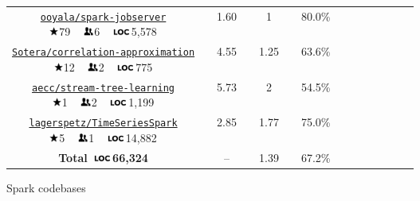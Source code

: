 \documentclass[runningheads]{llncs}
\newcommand{\myrowcolour}{\rowcolor[gray]{0.925}}
\newcommand*\loc{\includegraphics[height=0.65em,keepaspectratio]{loc}}
\newcommand*\stars{\includegraphics[height=0.8em,keepaspectratio]{stars}}
\newcommand*\contribs{\includegraphics[height=0.8em,keepaspectratio]{contribs}}
\begin{document}
\begin{sloppypar}
\begin{figure}
\begin{longtable}{c@{}c c@{}c c@{}c c@{}c c@{}c c@{}c c@{}c }
\myrowcolour%
\parbox[c][0.9cm]{4cm}{\centering\normalsize\href{https://github.com/ooyala/spark-jobserver}{\texttt{ooyala/spark-jobserver}}\\ \stars 79 ~ \contribs 6 ~ \loc 5,578} && 1.60 && 1 && 80.0\% \\

\parbox[c][0.9cm]{5cm}{\centering\normalsize\href{https://github.com/Sotera/correlation-approximation}{\texttt{Sotera/correlation-approximation}}\\ \stars 12 ~ \contribs 2 ~ \loc 775} && 4.55 && 1.25 && 63.6\% \\

\myrowcolour%
\parbox[c][0.9cm]{4cm}{\centering\normalsize\href{https://github.com/aecc/stream-tree-learning}{\texttt{aecc/stream-tree-learning}}\\ \stars 1 ~ \contribs 2 ~ \loc 1,199} && 5.73 && 2 && 54.5\% \\

\parbox[c][0.9cm]{5cm}{\centering\normalsize\href{https://github.com/lagerspetz/TimeSeriesSpark}{\texttt{lagerspetz/TimeSeriesSpark}}\\ \stars 5 ~ \contribs 1 ~ \loc 14,882} && 2.85 && 1.77 && 75.0\% \\

\bottomrule

\textbf{Total~\loc 66,324} && -- && 1.39 && 67.2\% \\

\bottomrule

\end{longtable}
\caption{Spark codebases}
\end{figure}



%





\end{sloppypar}
\end{document}
